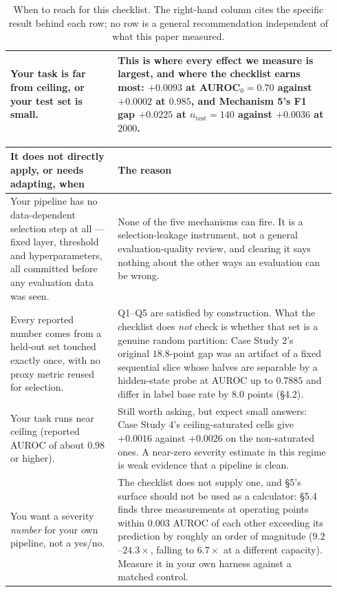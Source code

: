 \documentclass[10pt]{article} %
\begin{document}
\begin{table}[!ht]
\begin{tabular}{@{}p{0.31\linewidth}p{0.63\linewidth}@{}}
\addlinespace
Your task is far from ceiling, or your test set is small. & This is where every effect we measure is largest, and where the checklist earns most: $+0.0093$ at AUROC$_0=0.70$ against $+0.0002$ at $0.985$, and Mechanism 5's F1 gap $+0.0225$ at $n_{\text{test}}=140$ against $+0.0036$ at $2000$. \\
\bottomrule
\end{tabular}
\caption{When to reach for this checklist. The right-hand column cites the
specific result behind each row; no row is a general recommendation
independent of what this paper measured.}
\label{tab:checklist-scope}
\end{table}

\begin{table}[!ht]
\centering
\small
\begin{tabular}{@{}p{0.31\linewidth}p{0.63\linewidth}@{}}
\toprule
It does not directly apply, or needs adapting, when & The reason \\
\midrule
Your pipeline has no data-dependent selection step at all --- fixed layer, threshold and hyperparameters, all committed before any evaluation data was seen. & None of the five mechanisms can fire. It is a selection-leakage instrument, not a general evaluation-quality review, and clearing it says nothing about the other ways an evaluation can be wrong. \\
\addlinespace
Every reported number comes from a held-out set touched exactly once, with no proxy metric reused for selection. & Q1--Q5 are satisfied by construction. What the checklist does \emph{not} check is whether that set is a genuine random partition: Case Study 2's original $18.8$-point gap was an artifact of a fixed sequential slice whose halves are separable by a hidden-state probe at AUROC up to $0.7885$ and differ in label base rate by $8.0$ points (§4.2). \\
\addlinespace
Your task runs near ceiling (reported AUROC of about $0.98$ or higher). & Still worth asking, but expect small answers: Case Study 4's ceiling-saturated cells give $+0.0016$ against $+0.0026$ on the non-saturated ones. A near-zero severity estimate in this regime is weak evidence that a pipeline is clean. \\
\addlinespace
You want a severity \emph{number} for your own pipeline, not a yes/no. & The checklist does not supply one, and §5's surface should not be used as a calculator: §5.4 finds three measurements at operating points within $0.003$ AUROC of each other exceeding its prediction by roughly an order of magnitude ($9.2$--$24.3\times$, falling to $6.7\times$ at a different capacity). Measure it in your own harness against a matched control. \\

\end{tabular}
\end{table}
\end{document}
